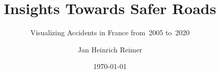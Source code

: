 \documentclass[usegeometry=true]{scrartcl}
\begin{document}
\subject{Project Report for the Module \\  \\ in Summer Semester~2022}
\title{Insights Towards Safer Roads}
\subtitle{Visualizing Accidents in France from~2005 to~2020}
\author{Jan Heinrich Reimer}
\date{\today}
\maketitle

\tableofcontents
\clearpage







\clearpage

\clearpage
\printbibliography
\end{document}
